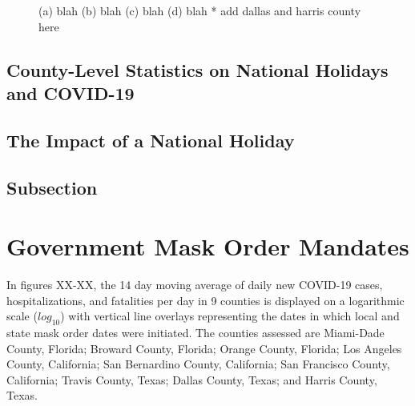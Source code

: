 \documentclass[]{article}
\begin{document}
\begin{figure}
	\caption{(a) blah (b) blah (c) blah (d) blah * add dallas and harris county here}
	\label{fig:foobar}
\end{figure}

\FloatBarrier
\subsection{County-Level Statistics on National Holidays and COVID-19}
\subsection{The Impact of a National Holiday}
\subsection{Subsection}

\FloatBarrier
\vspace{5mm}
\section{Government Mask Order Mandates}

In figures XX-XX, the 14 day moving average of daily new COVID-19 cases, hospitalizations, and fatalities per day in 9 counties is displayed on a logarithmic scale ($log_{10}$) with vertical line overlays representing the dates in which local and state mask order dates were initiated. The counties assessed are Miami-Dade County, Florida; Broward County, Florida; Orange County, Florida; Los Angeles County, California; San Bernardino County, California; San Francisco County, California; Travis County, Texas; Dallas County, Texas; and Harris County, Texas.
\end{document}
